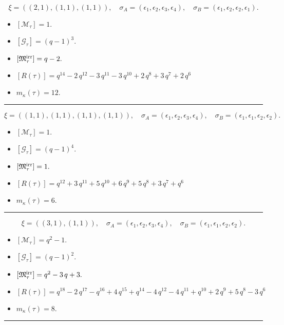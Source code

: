 \documentclass[10pt,a4paper]{amsart}
\begin{document}
$$\xi = ({(2, 1), (1, 1), (1, 1)}),\quad \sigma_A = ({{\epsilon_1, \epsilon_2}, {\epsilon_3}, {\epsilon_4}}),\quad \sigma_B = ({{\epsilon_1, \epsilon_2}, {\epsilon_2}, {\epsilon_1}}).$$

\begin{itemize}
 \item $[\mathcal{M}_{\tau}] = 1 .$

 \item $[\mathcal{G}_{\tau}] = {\left(q - 1\right)}^{3} .$

 \item $[{\frak M}_{\tau}^{\textrm{irr}}] = q - 2 .$

 \item $[R(\tau)] = q^{14} - 2 \, q^{12} - 3 \, q^{11} - 3 \, q^{10} + 2 \, q^{8} + 3 \, q^{7} + 2 \, q^{6} $

 \item $m_{\kappa}(\tau) = 12 .$

 \end{itemize}
\noindent\rule{8cm}{0.4pt}

$$\xi = ({(1, 1), (1, 1), (1, 1), (1, 1)}),\quad \sigma_A = ({{\epsilon_1}, {\epsilon_2}, {\epsilon_3}, {\epsilon_4}}),\quad \sigma_B = ({{\epsilon_1}, {\epsilon_1}, {\epsilon_2}, {\epsilon_2}}).$$

\begin{itemize}
 \item $[\mathcal{M}_{\tau}] = 1 .$

 \item $[\mathcal{G}_{\tau}] = {\left(q - 1\right)}^{4} .$

 \item $[{\frak M}_{\tau}^{\textrm{irr}}] = 1 .$

 \item $[R(\tau)] = q^{12} + 3 \, q^{11} + 5 \, q^{10} + 6 \, q^{9} + 5 \, q^{8} + 3 \, q^{7} + q^{6} $

 \item $m_{\kappa}(\tau) = 6 .$

 \end{itemize}
\noindent\rule{8cm}{0.4pt}

$$\xi = ({(3, 1)}, {(1, 1)}),\quad \sigma_A = ({{\epsilon_1, \epsilon_2, \epsilon_3}}, {{\epsilon_4}}),\quad \sigma_B = ({{\epsilon_1, \epsilon_1, \epsilon_2}}, {{\epsilon_2}}).$$

\begin{itemize}
 \item $[\mathcal{M}_{\tau}] = q^{2} - 1 .$

 \item $[\mathcal{G}_{\tau}] = {\left(q - 1\right)}^{2} .$

 \item $[{\frak M}_{\tau}^{\textrm{irr}}] = q^{2} - 3 \, q + 3 .$

 \item $[R(\tau)] = q^{18} - 2 \, q^{17} - q^{16} + 4 \, q^{15} + q^{14} - 4 \, q^{12} - 4 \, q^{11} + q^{10} + 2 \, q^{9} + 5 \, q^{8} - 3 \, q^{6} $

 \item $m_{\kappa}(\tau) = 8 .$

 \end{itemize}
\noindent\rule{8cm}{0.4pt}
\end{document}
